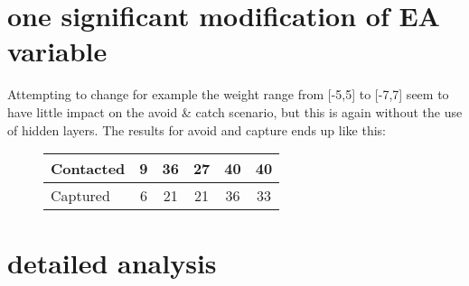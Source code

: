 \documentclass[12pt, a4paper]{article}
\begin{document}
\section{one significant modification of EA variable}
Attempting to change for example the weight range from [-5,5] to [-7,7] seem to have little impact on the avoid & catch scenario, but this is again without the use of hidden layers. The results for avoid and capture ends up like this:

\begin{figure}[H]
	\begin{center}
		\begin{tabular}{l | c | c |c |c |c }
		 Contacted& 9 & 36 & 27 & 40 & 40\\ \hline
		 Captured & 6 & 21 & 21 & 36 & 33\\
		 
		\end{tabular}
	\end{center}
\end{figure}



\section{detailed analysis}
\end{document}

